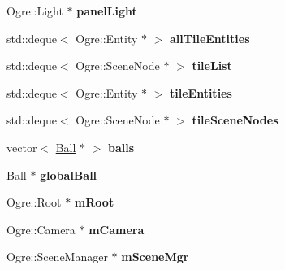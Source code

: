\begin{DoxyCompactItemize}
\item 
\hypertarget{classMinimalOgre_a6dd278ab182b79e1df25bc72eb42dd07}{Ogre\-::\-Light $\ast$ {\bfseries panel\-Light}}\label{classMinimalOgre_a6dd278ab182b79e1df25bc72eb42dd07}

\item 
\hypertarget{classMinimalOgre_a5145f58f6bfdb66b7a30ac42b3e4ce05}{std\-::deque$<$ Ogre\-::\-Entity $\ast$ $>$ {\bfseries all\-Tile\-Entities}}\label{classMinimalOgre_a5145f58f6bfdb66b7a30ac42b3e4ce05}

\item 
\hypertarget{classMinimalOgre_a2f6e1bccf51b9861d0c6ec3b8936611b}{std\-::deque$<$ Ogre\-::\-Scene\-Node $\ast$ $>$ {\bfseries tile\-List}}\label{classMinimalOgre_a2f6e1bccf51b9861d0c6ec3b8936611b}

\item 
\hypertarget{classMinimalOgre_a47ebccf06f5737f5a99658177b3010ff}{std\-::deque$<$ Ogre\-::\-Entity $\ast$ $>$ {\bfseries tile\-Entities}}\label{classMinimalOgre_a47ebccf06f5737f5a99658177b3010ff}

\item 
\hypertarget{classMinimalOgre_aa8fba26b8020b99d91eebbb865097d0a}{std\-::deque$<$ Ogre\-::\-Scene\-Node $\ast$ $>$ {\bfseries tile\-Scene\-Nodes}}\label{classMinimalOgre_aa8fba26b8020b99d91eebbb865097d0a}

\item 
\hypertarget{classMinimalOgre_adaae2eb6f9255adc8c1fc8819e22275a}{vector$<$ \hyperlink{classBall}{Ball} $\ast$ $>$ {\bfseries balls}}\label{classMinimalOgre_adaae2eb6f9255adc8c1fc8819e22275a}

\item 
\hypertarget{classMinimalOgre_a8bcd32d173e07026ecdc3ee6461f8025}{\hyperlink{classBall}{Ball} $\ast$ {\bfseries global\-Ball}}\label{classMinimalOgre_a8bcd32d173e07026ecdc3ee6461f8025}

\item 
\hypertarget{classMinimalOgre_a36e21277ac72fe8cad1e267813b718fd}{Ogre\-::\-Root $\ast$ {\bfseries m\-Root}}\label{classMinimalOgre_a36e21277ac72fe8cad1e267813b718fd}

\item 
\hypertarget{classMinimalOgre_a05d073ed9d5e9b0f676bd79a4c076095}{Ogre\-::\-Camera $\ast$ {\bfseries m\-Camera}}\label{classMinimalOgre_a05d073ed9d5e9b0f676bd79a4c076095}

\item 
\hypertarget{classMinimalOgre_a5eab58cd8b82db271b10b429772d633e}{Ogre\-::\-Scene\-Manager $\ast$ {\bfseries m\-Scene\-Mgr}}\label{classMinimalOgre_a5eab58cd8b82db271b10b429772d633e}


\end{DoxyCompactItemize}

